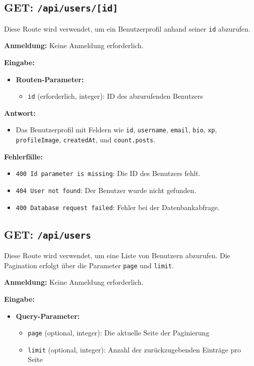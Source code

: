 \documentclass[a4paper,12pt]{article}
\begin{document}
\subsection{GET: \texttt{/api/users/[id]}}

Diese Route wird verwendet, um ein Benutzerprofil anhand seiner \texttt{id} abzurufen.

\textbf{Anmeldung:} Keine Anmeldung erforderlich.

\textbf{Eingabe:}
\begin{itemize}
    \item \textbf{Routen-Parameter:}
    \begin{itemize}
        \item \texttt{id} (erforderlich, integer): ID des abzurufenden Benutzers
    \end{itemize}
\end{itemize}

\textbf{Antwort:}
\begin{itemize}
    \item Das Benutzerprofil mit Feldern wie \texttt{id}, \texttt{username}, \texttt{email}, \texttt{bio}, \texttt{xp}, \texttt{profileImage}, \texttt{createdAt}, und \texttt{count.posts}.
\end{itemize}

\textbf{Fehlerfälle:}
\begin{itemize}
    \item \texttt{400 Id parameter is missing}: Die ID des Benutzers fehlt.
    \item \texttt{404 User not found}: Der Benutzer wurde nicht gefunden.
    \item \texttt{400 Database request failed}: Fehler bei der Datenbankabfrage.
\end{itemize}

\subsection{GET: \texttt{/api/users}}

Diese Route wird verwendet, um eine Liste von Benutzern abzurufen. Die Pagination erfolgt über die Parameter \texttt{page} und \texttt{limit}.

\textbf{Anmeldung:} Keine Anmeldung erforderlich.

\textbf{Eingabe:}
\begin{itemize}
    \item \textbf{Query-Parameter:}
    \begin{itemize}
        \item \texttt{page} (optional, integer): Die aktuelle Seite der Paginierung
        \item \texttt{limit} (optional, integer): Anzahl der zurückzugebenden Einträge pro Seite
    \end{itemize}
\end{itemize}
\end{document}
